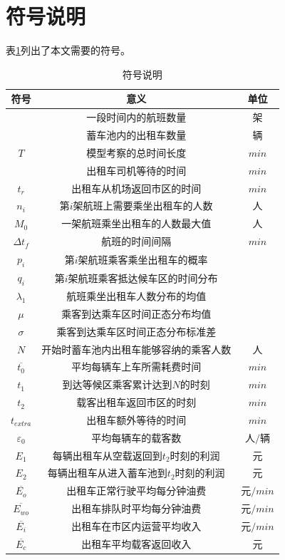\documentclass{cumcm}
\begin{document}
\section{符号说明}
表\ref{table-symbol}列出了本文需要的符号。
\begin{table}[H]
	\centering
	\caption{符号说明} 
	\label{table-symbol}
	\begin{tabular*}{0.65\textwidth}{ccc}
		\toprule
		符号 & 意义 & 单位 \\
		\midrule
		\flightnum & 一段时间内的航班数量 & 架 \\
		\taxinum & 蓄车池内的出租车数量 & 辆 \\
		$T$ & 模型考察的总时间长度 & $min$ \\
		\waittime & 出租车司机等待的时间 & $min$ \\
		$t_r$ & 出租车从机场返回市区的时间 & $min$ \\
		$n_i$ & 第$i$架航班上需要乘坐出租车的人数 & 人 \\
		$M_0$ & 一架航班乘坐出租车的人数最大值 & 人 \\
		$\Delta t_f$ & 航班的时间间隔 & $min$ \\
		$p_i$ & 第$i$架航班乘客乘坐出租车的概率 & \\
		$q_i$ & 第$i$架航班乘客抵达候车区的时间分布 & \\
		$\lambda_1$ & 航班乘坐出租车人数分布的均值 & \\
		$\mu$ & 乘客到达乘车区时间正态分布均值 & \\
		$\sigma$ & 乘客到达乘车区时间正态分布标准差 & \\
		$N$ & 开始时蓄车池内出租车能够容纳的乘客人数 & 人 \\
		$\overline{t_0}$ & 平均每辆车上车所需耗费时间 & $min$ \\
		$t_1$ & 到达等候区乘客累计达到$N$的时刻 & $min$ \\
		$t_2$ & 载客出租车返回市区的时刻 & $min$ \\
		$t_{extra}$ & 出租车额外等待的时间 & $min$ \\
		$\varepsilon_0$ & 平均每辆车的载客数 & 人$/$辆 \\
		$E_1$ & 每辆出租车从空载返回到$t_2$时刻的利润 & 元 \\
		$E_2$ & 每辆出租车从进入蓄车池到$t_2$时刻的利润 & 元 \\
		$\overline{E_o}$ & 出租车正常行驶平均每分钟油费 & 元$/min$ \\
		$\overline{E_{wo}}$ & 出租车排队时平均每分钟油费 & 元$/min$ \\		$\overline{E_i}$ & 出租车在市区内运营平均收入 & 元$/min$ \\
		$\overline{E_c}$ & 出租车平均载客返回收入 & 元 \\
		\bottomrule
	\end{tabular*}
\end{table}
\end{document}
